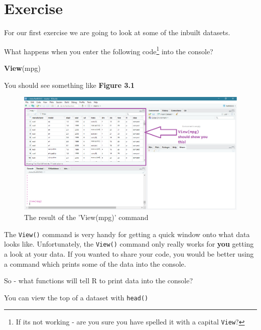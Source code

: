 \documentclass[
]{book}
\newenvironment{Shaded}{\begin{snugshade}}{\end{snugshade}}
\newcommand{\KeywordTok}[1]{\textcolor[rgb]{0.13,0.29,0.53}{\textbf{#1}}}
\newcommand{\NormalTok}[1]{#1}
\begin{document}
\hypertarget{ex_inbuiltdata}{%
\section{Exercise}\label{ex_inbuiltdata}}

For our first exercise we are going to look at some of the inbuilt datasets.

What happens when you enter the following code\footnote{If its not working - are you sure you have spelled it with a capital \texttt{View}?} into the console?

\begin{Shaded}
\begin{Highlighting}[]
\KeywordTok{View}\NormalTok{(mpg)}
\end{Highlighting}
\end{Shaded}

You should see something like \textbf{Figure 3.1}

\begin{figure}

{\centering \includegraphics[width=13.31in]{images/03_data/rstud01} 

}

\caption{The result of the 'View(mpg)' command}\label{fig:unnamed-chunk-42}
\end{figure}

The \texttt{View()} command is very handy for getting a quick window onto what data looks like. Unfortunately, the \texttt{View()} command only really works for \textbf{you} getting a look at your data. If you wanted to share your code, you would be better using a command which prints some of the data into the console.

So - what functions will tell R to print data into the console?

You can view the top of a dataset with \texttt{head()}
\end{document}
